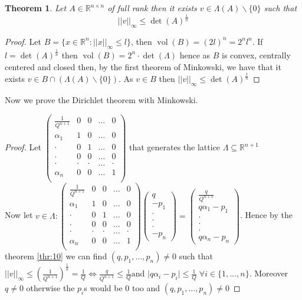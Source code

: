 \documentclass[a4paper,11pt,american]{article}
\newcommand{\R}{\mathbb{R}}
\DeclareMathOperator{\vol}{vol}
\theoremstyle{plain}
\newtheorem{theorem}{Theorem}
\theoremstyle{definition}
\begin{document}
\begin{theorem}\label{thr:10}
    Let $A\in \R^{n\times n}$ of full rank then it exists $v\in \Lambda(A)\backslash\{0\}$ such that $$\vert\vert v\vert\vert _{\infty}\leq \det(A)^\frac{1}{n}$$
\end{theorem}
\begin{proof}
    Let $B=\{x\in \R^n:\vert\vert x\vert\vert_{\infty}\leq l\}$, then $\vol(B)=(2l)^n=2^nl^n$. If $l= \det(A)^\frac{1}{n}$ then $\vol(B)=2^n\cdot\det(\Lambda)$ hence as $B$ is convex, centrally centered and closed then, by the first theorem of Minkowski, we have that it exists $v\in B\cap (\Lambda(A)\backslash \{0\})$. As $v\in B$ then $\vert\vert v\vert\vert _{\infty}\leq \det(A)^\frac{1}{n}$ 
\end{proof}
Now we prove the Dirichlet theorem with Minkowski.
\begin{proof}
    
Let $\begin{pmatrix}
    \frac{1}{Q^{n+1}}& 0& 0 &\dots& 0\\
    \alpha_1& 1&0&\dots&0\\
    \cdot&0&1&\dots&0\\
    \cdot&0&0&\dots&0\\
    \cdot&\cdot&\cdot&\dots&\cdot\\
    \alpha_n&0&0&\dots&1\\
\end{pmatrix}$
 that generates the lattice $\Lambda\subseteq\R^{n+1}$\\
 Now let $v\in\Lambda:\begin{pmatrix}
    \frac{1}{Q^{n+1}}& 0& 0 &\dots& 0\\
    \alpha_1& 1&0&\dots&0\\
    \cdot&0&1&\dots&0\\
    \cdot&0&0&\dots&0\\
    \cdot&\cdot&\cdot&\dots&\cdot\\
    \alpha_n&0&0&\dots&1\\
\end{pmatrix}\begin{pmatrix}
    q\\
    -p_1\\
    \cdot\\
    \cdot\\
    \cdot\\
    -p_n
\end{pmatrix}=\begin{pmatrix}
    \frac{q}{Q^{n+1}}\\
    q\alpha_1-p_1\\
    \cdot\\
    \cdot\\
    \cdot\\
    q\alpha_n-p_n
\end{pmatrix}$.
Hence by the theorem \eqref{thr:10} we can find $(q,p_1,\dots,p_n)\neq 0$ such that $\vert\vert v\vert\vert_{\infty}\leq(\frac{1}{Q^{n+1}})^{\frac{1}{n}}=\frac{1}{Q}\iff \frac{q}{Q^{n+1}}\leq \frac{1}{Q} \text{and } \vert q\alpha_i-p_i\vert\leq \frac{1}{Q} \;\forall i\in\{1,\dots,n\}$. Moreover $q\neq 0$ otherwise the $p_i$s would be $0$ too and $(q,p_1,\dots,p_n)\neq 0$
\end{proof}
\end{document}

